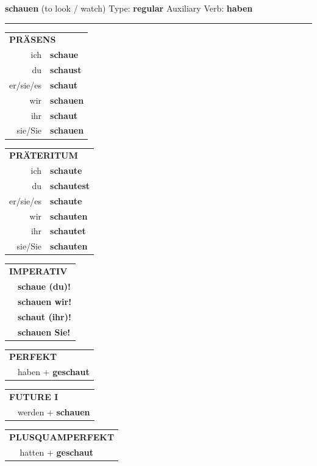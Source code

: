\documentclass[10pt,a4paper]{revtex4-2}
\begin{document}
\begin{verbbox}
{\Large \bf schauen} (to look / watch) \hfill Type: \textbf{regular} \hfill Auxiliary Verb: \textbf{haben} 

\vspace{5pt}
\hrule
\vspace{5pt}

\begin{tabular}{rl}
\multicolumn{2}{l}{\textbf{PRÄSENS}}\\
ich & \textbf{schaue}\\
du & \textbf{schaust}\\
er/sie/es & \textbf{schaut}\\
wir & \textbf{schauen}\\
ihr & \textbf{schaut}\\
sie/Sie & \textbf{schauen}\\
\end{tabular}
\hfill
\begin{tabular}{rl}
\multicolumn{2}{l}{\textbf{PRÄTERITUM}}\\
ich & \textbf{schaute}\\
du & \textbf{schautest}\\
er/sie/es & \textbf{schaute}\\
wir & \textbf{schauten}\\
ihr & \textbf{schautet}\\
sie/Sie & \textbf{schauten}\\
\end{tabular}
\hfill
\begin{tabular}{rl}
\multicolumn{2}{l}{\textbf{IMPERATIV}}\\
& \textbf{schaue (du)!}\\
& \textbf{schauen wir!}\\
& \textbf{schaut (ihr)!}\\
& \textbf{schauen Sie!}\\
\end{tabular}

\vspace{10pt}

\begin{tabular}{rl}
\multicolumn{2}{l}{\textbf{PERFEKT}}\\
& haben + \textbf{geschaut}\\
\end{tabular}
\hfill
\begin{tabular}{rl}
\multicolumn{2}{l}{\textbf{FUTURE I}}\\
& werden + \textbf{schauen}\\
\end{tabular}
\hfill
\begin{tabular}{rl}
\multicolumn{2}{l}{\textbf{PLUSQUAMPERFEKT}}\\
& hatten + \textbf{geschaut}\\
\end{tabular}


\end{verbbox}
\end{document}

